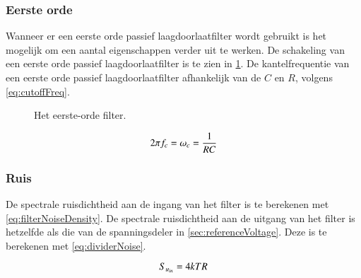 \subsubsection{Eerste orde}
Wanneer er een eerste orde passief laagdoorlaatfilter wordt gebruikt is het mogelijk om een aantal eigenschappen verder uit te werken.
De schakeling van een eerste orde passief laagdoorlaatfilter is te zien in \cref{fig:filterCircuit}. De kantelfrequentie van een eerste orde passief laagdoorlaatfilter afhankelijk van de $C$ en $R$, volgens \cref{eq:cutoffFreq}.
\begin{figure}[!htb]
    \centering
    \def\svgwidth{0.3\textwidth}
    
    \caption{Het eerste-orde filter.}
    \label{fig:filterCircuit}
\end{figure}
\begin{equation} \label{eq:cutoffFreq}
    2\pi f_c = \omega_c = \frac{1}{RC}
    \tagaddtext{[\si{\radian\per\second}]}
\end{equation}

\subsubsection{Ruis}
De spectrale ruisdichtheid aan de ingang van het filter is te berekenen met \cref{eq:filterNoiseDensity}.
De spectrale ruisdichtheid aan de uitgang van het filter is hetzelfde als die van de spanningsdeler in \cref{sec:referenceVoltage}. Deze is te berekenen met \cref{eq:dividerNoise}.




\begin{equation} \label{eq:filterNoiseDensity}
    S_{u_{in}} = 4kTR
    \tagaddtext{[\si{\volt\squared\per\hertz}]}
\end{equation}


